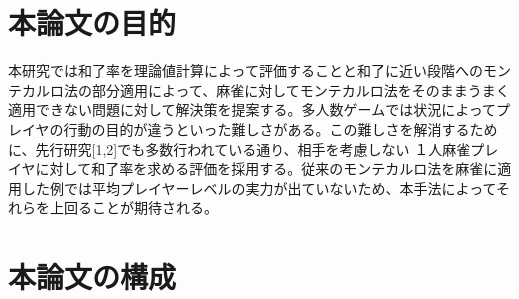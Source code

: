 \section{本論文の目的}
本研究では和了率を理論値計算によって評価することと和了に近い段階へのモンテカルロ法の部分適用によって、麻雀に対してモンテカルロ法をそのままうまく適用できない問題に対して解決策を提案する。多人数ゲームでは状況によってプレイヤの行動の目的が違うといった難しさがある。この難しさを解消するために、先行研究[1,2]でも多数行われている通り、相手を考慮しない １人麻雀プレイヤに対して和了率を求める評価を採用する。従来のモンテカルロ法を麻雀に適用した例では平均プレイヤーレベルの実力が出ていないため、本手法によってそれらを上回ることが期待される。
\section{本論文の構成}